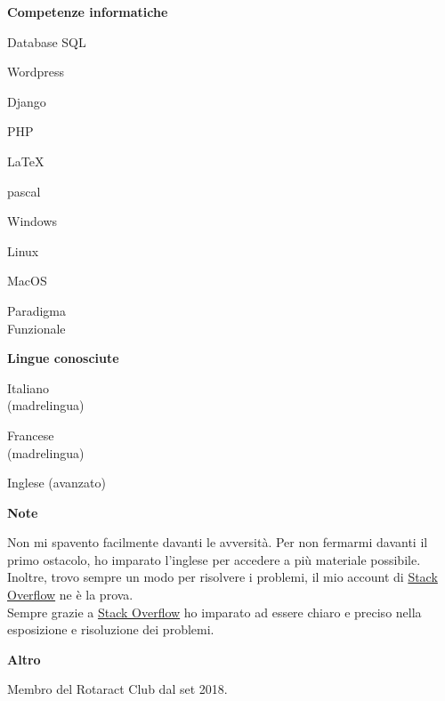 \documentclass[a4paper,12pt,final]{memoir}
\newcommand{\Sep}{\vspace{1.5em}}
\newcommand{\SmallSep}{\vspace{0.5em}}
\newcommand{\CVSection}[1]
	{\Large\textbf{#1}\par
	\SmallSep\normalsize\normalfont}
\newcommand{\CVItem}[1]
	{\textbf{\color{RoyalBlue} #1}}
\begin{document}
\CVItem{Competenze informatiche}
\begin{multicols}{3}
\begin{compactitem}[\color{RoyalBlue}$\circ$]
	\item Database SQL
	\item Wordpress
	\item Django
	\item PHP
	\item \LaTeX
	\item pascal
	\item Windows
	\item Linux
	\item MacOS
	\item Paradigma\\Funzionale
\end{compactitem}
\end{multicols}
\SmallSep

\clearpage
\framebreak
\framebreak

\CVItem{Lingue conosciute}
\begin{multicols}{3}
\begin{compactitem}[\color{RoyalBlue}$\circ$]
	\item Italiano\\(madrelingua)
	\item Francese\\(madrelingua)
	\item Inglese (avanzato)
\end{compactitem}
\end{multicols}
\Sep 

\CVSection{Note}
	Non mi spavento facilmente davanti le avversità.
	Per non fermarmi davanti il primo ostacolo, ho imparato l'inglese per accedere a più materiale possibile.
	\\Inoltre, trovo sempre un modo per risolvere i problemi, il mio account di \href{https://stackoverflow.com/users/6875945/mattia-rubini}{Stack Overflow} ne è la prova.
	\\Sempre grazie a \href{https://stackoverflow.com/users/6875945/mattia-rubini}{Stack Overflow} ho imparato ad essere chiaro e preciso nella esposizione e risoluzione dei problemi.

\CVSection{Altro}
	Membro del Rotaract Club dal set 2018.
\Sep


\end{document}
